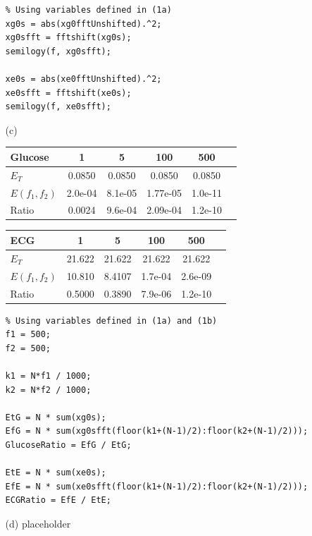 \documentclass{article}
\begin{document}
\begin{enumerate}
\begin{enumerate}
\bigskip

\begin{lstlisting}
% Using variables defined in (1a)
xg0s = abs(xg0fftUnshifted).^2;
xg0sfft = fftshift(xg0s);
semilogy(f, xg0sfft);

xe0s = abs(xe0fftUnshifted).^2;
xe0sfft = fftshift(xe0s);
semilogy(f, xe0sfft);
\end{lstlisting}

\bigskip

	\item[(c)] $\:$ \\
\begin{tabular}{l*{4}{c}r}
Glucose        &   1    &   5      &  100     &  500       \\
\hline
$E_T$          & 0.0850   & 0.0850   &  0.0850  &  0.0850  \\
$E(f_1,f_2)$   & 2.0e-04  & 8.1e-05  & 1.77e-05 & 1.0e-11  \\
Ratio          & 0.0024   & 9.6e-04  & 2.09e-04 & 1.2e-10  \\
\end{tabular}

\bigskip

\begin{tabular}{l*{4}{c}r}
ECG            &   1    &   5      &  100     &  500       \\
\hline
$E_T$          & 21.622   & 21.622   &  21.622  &  21.622  \\
$E(f_1,f_2)$   & 10.810   & 8.4107   & 1.7e-04  & 2.6e-09  \\
Ratio          & 0.5000   & 0.3890   & 7.9e-06  & 1.2e-10  \\
\end{tabular}

\bigskip

\begin{lstlisting}
% Using variables defined in (1a) and (1b)
f1 = 500;
f2 = 500;

k1 = N*f1 / 1000;
k2 = N*f2 / 1000;

EtG = N * sum(xg0s);
EfG = N * sum(xg0sfft(floor(k1+(N-1)/2):floor(k2+(N-1)/2)));
GlucoseRatio = EfG / EtG;

EtE = N * sum(xe0s);
EfE = N * sum(xe0sfft(floor(k1+(N-1)/2):floor(k2+(N-1)/2)));
ECGRatio = EfE / EtE;
\end{lstlisting}

\bigskip

	\item[(d)]
	placeholder

	\end{enumerate}


\end{enumerate}
\end{document}
